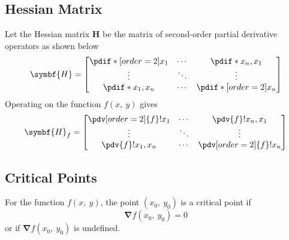 \documentclass{article}
\begin{document}
\subsection{Hessian Matrix}
\begin{definition}
    Let the Hessian matrix \(\symbf{H}\) be the matrix of second-order
    partial derivative operators as shown below
    \begin{equation*}
        \symbf{H} =
        \begin{bmatrix}
            \pdif*[order=2]{x_1} & \cdots & \pdif*{x_n,x_1}      \\
            \vdots               & \ddots & \vdots               \\
            \pdif*{x_1,x_n}      & \cdots & \pdif*[order=2]{x_n}
        \end{bmatrix}
    \end{equation*}
    Operating on the function \(f\left( x,\: y \right)\) gives
    \begin{equation*}
        \symbf{H}_f =
        \begin{bmatrix}
            \pdv[order=2]{f}!{x_1} & \cdots & \pdv{f}!{x_n,x_1}      \\
            \vdots                 & \ddots & \vdots                 \\
            \pdv{f}!{x_1,x_n}     & \cdots & \pdv[order=2]{f}!{x_n}
        \end{bmatrix}
    \end{equation*}
\end{definition}
\subsection{Critical Points}
For the function \(f\left( x,\: y \right)\), the point \(\left( x_0,\:
y_0 \right)\) is a critical point if
\begin{equation*}
    \symbf{\nabla}f\left( x_0,\: y_0 \right) = 0
\end{equation*}
or if \(\symbf{\nabla}f\left( x_0,\: y_0 \right)\) is undefined.
\end{document}
